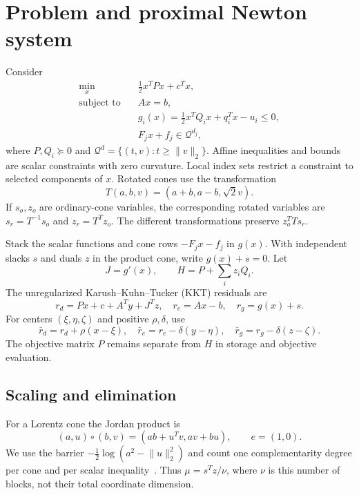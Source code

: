 \documentclass[conference]{IEEEtran}
\newcommand{\Q}{\mathcal{Q}}
\newcommand{\norm}[1]{\lVert#1\rVert}
\begin{document}
\section{Problem and proximal Newton system}
Consider
\begin{subequations}\label{eq:model}
\begin{align}
 \min_x\quad &\tfrac12x^TPx+c^Tx,\\
 \text{subject to}\quad &Ax=b,\\
 &g_i(x)=\tfrac12x^TQ_ix+q_i^Tx-u_i\leq0,\\
 &F_jx+f_j\in\Q^{d_j},
\end{align}
\end{subequations}
where $P,Q_i\succeq0$ and $\Q^d=\{(t,v):t\geq\norm{v}_2\}$. Affine inequalities and bounds are scalar constraints with zero curvature. Local index sets restrict a constraint to selected components of $x$. Rotated cones use the transformation
\begin{equation}
 T(a,b,v)=(a+b,a-b,\sqrt2v).
\end{equation}
If $s_o,z_o$ are ordinary-cone variables, the corresponding rotated variables are $s_r=T^{-1}s_o$ and $z_r=T^Tz_o$. The different transformations preserve $z_o^TTs_r$.

Stack the scalar functions and cone rows $-F_jx-f_j$ in $g(x)$. With independent slacks $s$ and duals $z$ in the product cone, write $g(x)+s=0$. Let
\begin{equation}
 J=g'(x),\qquad H=P+\sum_i z_iQ_i.
\end{equation}
The unregularized Karush--Kuhn--Tucker (KKT) residuals are
\begin{equation}
 r_d=Px+c+A^Ty+J^Tz,\quad r_e=Ax-b,\quad r_g=g(x)+s.
\end{equation}
For centers $(\xi,\eta,\zeta)$ and positive $\rho,\delta$, use
\begin{equation}\label{eq:prox}
 \bar r_d=r_d+\rho(x-\xi),\quad
 \bar r_e=r_e-\delta(y-\eta),\quad
 \bar r_g=r_g-\delta(z-\zeta).
\end{equation}
The objective matrix $P$ remains separate from $H$ in storage and objective evaluation.

\subsection{Scaling and elimination}
For a Lorentz cone the Jordan product is
\begin{equation}
 (a,u)\circ(b,v)=(ab+u^Tv,av+bu),\qquad e=(1,0).
\end{equation}
We use the barrier $-\tfrac12\log(a^2-\norm{u}_2^2)$ and count one complementarity degree per cone and per scalar inequality~\cite{cvxopt}. Thus $\mu=s^Tz/\nu$, where $\nu$ is this number of blocks, not their total coordinate dimension.
\end{document}
